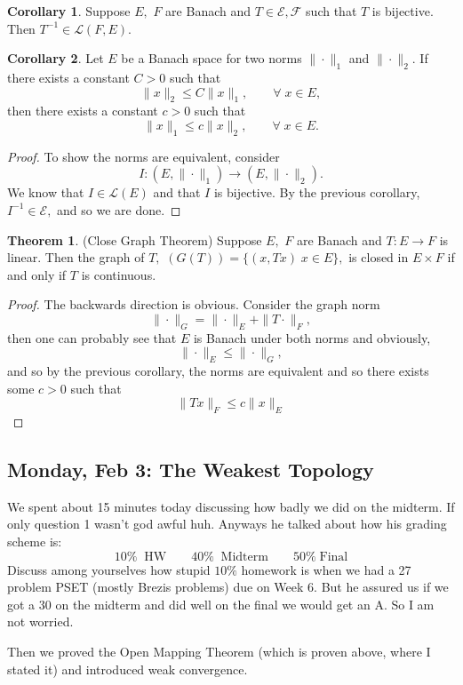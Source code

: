 \documentclass[10pt, oneside]{article}
\theoremstyle{definition}
\newtheorem{thm}{Theorem}
\newtheorem{cor}{Corollary}
\begin{document}
\begin{cor}
    Suppose $E,$ $F$ are Banach and $T\in \mathcal{E, F}$ such that $T$ is bijective. Then $T^{-1}\in \mathcal{L}(F, E).$
\end{cor}
\begin{cor}
    Let $E$ be a Banach space for two norms $\|\cdot\|_1$ and $\|\cdot\|_2.$ If there exists a constant $C>0$ such that 
    \[\|x\|_2 \leq C\|x\|_1, \qquad \forall\; x\in E,\] then there exists a constant $c>0$ such that 
    \[\|x\|_1 \leq c\|x\|_2, \qquad \forall\; x\in E.\]
\end{cor}
\begin{proof}
    To show the norms are equivalent, consider 
    \[I : (E, \|\cdot\|_1) \to (E, \|\cdot\|_2).\] We know that $I\in \mathcal{L}(E)$ and that $I$ is bijective. By the previous corollary, $I^{-1}\in \mathcal{E},$ and so we are done.
\end{proof}

\begin{thm}
    (Close Graph Theorem) Suppose $E,$ $F$ are Banach and $T: E\to F$ is linear. Then the graph of $T,$ $(G(T))= \{(x, Tx) \; x\in E\},$ is closed in $E\times F$ if and only if $T$ is continuous.
\end{thm}
\begin{proof}
    The backwards direction is obvious. Consider the graph norm
    \[\|\cdot\|_G = \|\cdot\|_E + \|T\cdot\|_F,\] then one can probably see that $E$ is Banach under both norms and obviously,
    \[\|\cdot\|_E \leq \|\cdot\|_G,\] and so by the previous corollary, the norms are equivalent and so there exists some $c>0$ such that 
    \[\|Tx\|_F \leq c\|x\|_E\]
\end{proof}

\newpage
\subsection{Monday, Feb 3: The Weakest Topology}
We spent about 15 minutes today discussing how badly we did on the midterm. If only question 1 wasn't god awful huh. Anyways he talked about how his grading scheme is:
\[10\% \;\; \text{HW} \qquad 40\%\;\; \text{Midterm} \qquad 50\% \; \text{Final}\]
Discuss among yourselves how stupid $10\%$ homework is when we had a 27 problem PSET (mostly Brezis problems) due on Week 6. But he assured us if we got a 30 on the midterm and did well on the final we would get an A. So I am not worried.

Then we proved the Open Mapping Theorem (which is proven above, where I stated it) and introduced weak convergence.
\end{document}
